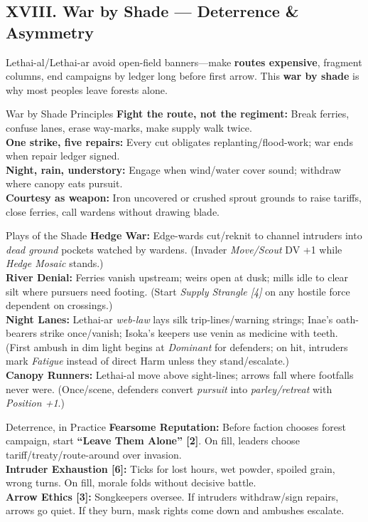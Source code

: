 \documentclass[11pt]{book}
\begin{document}
\subsection{XVIII. War by Shade --- Deterrence \& Asymmetry}
Lethai-al/Lethai-ar avoid open-field banners---make \textbf{routes expensive}, fragment columns, end campaigns by ledger long before first arrow. This \textbf{war by shade} is why most peoples leave forests alone.
\begin{atTheTable}{War by Shade Principles}
\textbf{Fight the route, not the regiment:} Break ferries, confuse lanes, erase way-marks, make supply walk twice. \\
\textbf{One strike, five repairs:} Every cut obligates replanting/flood-work; war ends when repair ledger signed. \\
\textbf{Night, rain, understory:} Engage when wind/water cover sound; withdraw where canopy eats pursuit. \\
\textbf{Courtesy as weapon:} Iron uncovered or crushed sprout grounds to raise tariffs, close ferries, call wardens without drawing blade.
\end{atTheTable}
\begin{atTheTable}{Plays of the Shade}
\textbf{Hedge War:} Edge-wards cut/reknit to channel intruders into \emph{dead ground} pockets watched by wardens. (Invader \emph{Move/Scout} DV +1 while \emph{Hedge Mosaic} stands.) \\
\textbf{River Denial:} Ferries vanish upstream; weirs open at dusk; mills idle to clear silt where pursuers need footing. (Start \emph{Supply Strangle [4]} on any hostile force dependent on crossings.) \\
\textbf{Night Lanes:} Lethai-ar \emph{web-law} lays silk trip-lines/warning strings; Inae's oath-bearers strike once/vanish; Isoka's keepers use venin as medicine with teeth. (First ambush in dim light begins at \emph{Dominant} for defenders; on hit, intruders mark \emph{Fatigue} instead of direct Harm unless they stand/escalate.) \\
\textbf{Canopy Runners:} Lethai-al move above sight-lines; arrows fall where footfalls never were. (Once/scene, defenders convert \emph{pursuit} into \emph{parley/retreat} with \emph{Position +1}.)
\end{atTheTable}
\begin{atTheTable}{Deterrence, in Practice}
\textbf{Fearsome Reputation:} Before faction chooses forest campaign, start \textbf{``Leave Them Alone'' [2]}. On fill, leaders choose tariff/treaty/route-around over invasion. \\
\textbf{Intruder Exhaustion [6]:} Ticks for lost hours, wet powder, spoiled grain, wrong turns. On fill, morale folds without decisive battle. \\
\textbf{Arrow Ethics [3]:} Songkeepers oversee. If intruders withdraw/sign repairs, arrows go quiet. If they burn, mask rights come down and ambushes escalate.
\end{atTheTable}
\end{document}
